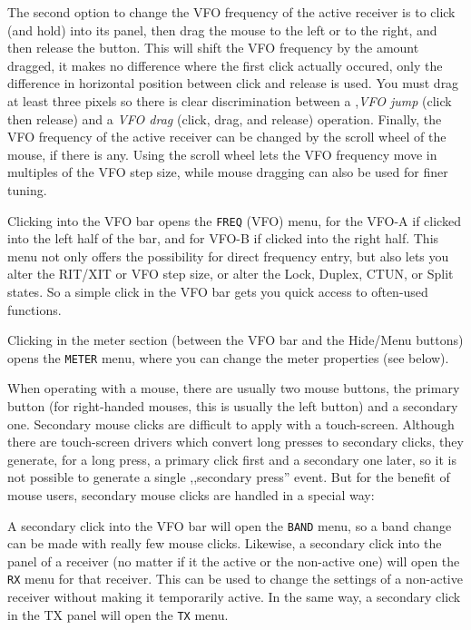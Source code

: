 \documentclass[12pt]{book}
\def\bltt#1{\texttt{\color{blue}#1}}
\begin{document}
The second option to change the VFO frequency of the active receiver
is to click (and hold) into its panel, then drag the mouse to the left
or to the right, and then release the button. This will shift the
VFO frequency by the amount dragged, it makes no difference 
where the first click actually occured, only the difference
in horizontal position between click and release is used. You must
drag at least three pixels so there is clear discrimination between
a ,\textit{VFO jump} (click then release) and a \textit{VFO drag} (click, drag,
and release) operation. Finally, the VFO frequency of the active
receiver can be changed by the scroll wheel of the mouse, if there
is any. Using the scroll wheel lets the VFO frequency move in multiples
of the VFO step size, while mouse dragging can also be used for
finer tuning.

Clicking into the VFO bar opens the \bltt{FREQ} (VFO) menu,
for the VFO-A if clicked into the left half of the bar, and for
VFO-B if clicked into the right half. This menu not only offers
the possibility for direct frequency entry, but also lets you 
alter the RIT/XIT or VFO step size, or alter the Lock, Duplex,
CTUN, or Split states. So a simple click in the VFO bar 
gets you quick access to often-used functions.

Clicking in the meter section (between the VFO bar and the
Hide/Menu buttons) opens the \bltt{METER} menu, where
you can change the meter properties (see below).

When operating with a mouse, there are usually two mouse buttons,
the primary button (for right-handed mouses, this is usually
the left button) and a secondary one. Secondary mouse clicks
are difficult to apply with a touch-screen. Although there are
touch-screen drivers which convert long presses to secondary clicks,
they generate, for a long press, a primary click first and a
secondary one later, so it is not possible to generate a
single ,,secondary press'' event. But for the benefit of
mouse users, secondary mouse clicks are handled in a special way:

A secondary click into the VFO bar will open the \bltt{BAND} menu,
so a band change can be made with really few mouse clicks. Likewise,
a secondary click into the panel of a receiver (no matter if it
the active or the non-active one) will open the \bltt{RX} menu
for that receiver. This can be used to change the settings of a
non-active receiver without making it temporarily active. In the
same way, a secondary click in the TX panel will open the
\bltt{TX} menu.
\end{document}
